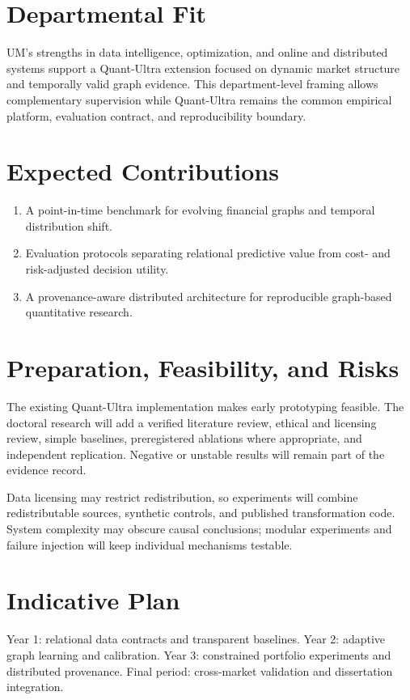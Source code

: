 \documentclass[11pt]{article}
\begin{document}
\newpage
\section*{Departmental Fit}
UM's strengths in data intelligence, optimization, and online and distributed systems support a Quant-Ultra extension focused on dynamic market structure and temporally valid graph evidence. This department-level framing allows complementary supervision while Quant-Ultra remains the common empirical platform, evaluation contract, and reproducibility boundary.

\section*{Expected Contributions}
\begin{enumerate}
\item A point-in-time benchmark for evolving financial graphs and temporal distribution shift.
\item Evaluation protocols separating relational predictive value from cost- and risk-adjusted decision utility.
\item A provenance-aware distributed architecture for reproducible graph-based quantitative research.
\end{enumerate}

\section*{Preparation, Feasibility, and Risks}
The existing Quant-Ultra implementation makes early prototyping feasible. The doctoral research will add a verified literature review, ethical and licensing review, simple baselines, preregistered ablations where appropriate, and independent replication. Negative or unstable results will remain part of the evidence record.

Data licensing may restrict redistribution, so experiments will combine redistributable sources, synthetic controls, and published transformation code. System complexity may obscure causal conclusions; modular experiments and failure injection will keep individual mechanisms testable.

\section*{Indicative Plan}
Year 1: relational data contracts and transparent baselines. Year 2: adaptive graph learning and calibration. Year 3: constrained portfolio experiments and distributed provenance. Final period: cross-market validation and dissertation integration.
\end{document}
